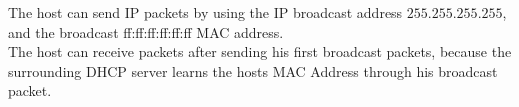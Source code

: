 The host can send IP packets by using the IP broadcast address $255.255.255.255$, and the broadcast ff:ff:ff:ff:ff:ff MAC address. \\
The host can receive packets after sending his first broadcast packets, because the surrounding DHCP server learns the hosts MAC Address through his broadcast packet.
